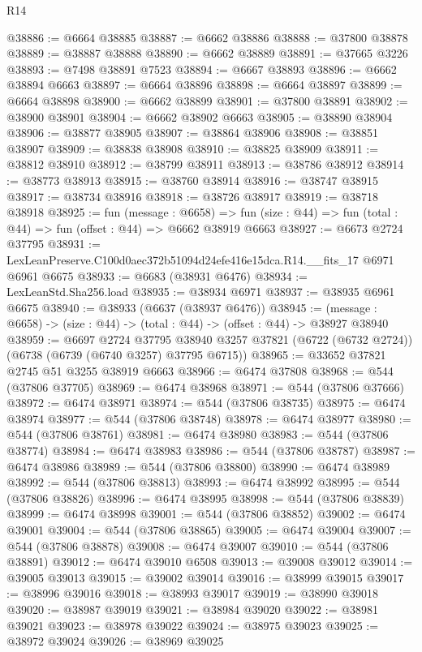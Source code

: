 \begin{lexlean}{R14}
\begin{coremodule}
@38886 := @6664 @38885
@38887 := @6662 @38886
@38888 := @37800 @38878
@38889 := @38887 @38888
@38890 := @6662 @38889
@38891 := @37665 @3226
@38893 := @7498 @38891 @7523
@38894 := @6667 @38893
@38896 := @6662 @38894 @6663
@38897 := @6664 @38896
@38898 := @6664 @38897
@38899 := @6664 @38898
@38900 := @6662 @38899
@38901 := @37800 @38891
@38902 := @38900 @38901
@38904 := @6662 @38902 @6663
@38905 := @38890 @38904
@38906 := @38877 @38905
@38907 := @38864 @38906
@38908 := @38851 @38907
@38909 := @38838 @38908
@38910 := @38825 @38909
@38911 := @38812 @38910
@38912 := @38799 @38911
@38913 := @38786 @38912
@38914 := @38773 @38913
@38915 := @38760 @38914
@38916 := @38747 @38915
@38917 := @38734 @38916
@38918 := @38726 @38917
@38919 := @38718 @38918
@38925 := fun (message : @6658) =>
  fun (size : @44) => fun (total : @44) => fun (offset : @44) => @6662 @38919 @6663
@38927 := @6673 @2724 @37795
@38931 := LexLeanPreserve.C100d0aec372b51094d24efe416e15dca.R14.__fits_17 @6971 @6961 @6675
@38933 := @6683 (@38931 @6476)
@38934 := LexLeanStd.Sha256.load
@38935 := @38934 @6971
@38937 := @38935 @6961 @6675
@38940 := @38933 (@6637 (@38937 @6476))
@38945 := (message : @6658) -> (size : @44) -> (total : @44) -> (offset : @44) -> @38927 @38940
@38959 := @6697
    @2724
    @37795
    @38940
    @3257
    @37821
    (@6722 (@6732 @2724))
    (@6738 (@6739 (@6740 @3257) @37795 @6715))
@38965 := @33652 @37821 @2745 @51 @3255 @38919 @6663
@38966 := @6474 @37808
@38968 := @544 (@37806 @37705)
@38969 := @6474 @38968
@38971 := @544 (@37806 @37666)
@38972 := @6474 @38971
@38974 := @544 (@37806 @38735)
@38975 := @6474 @38974
@38977 := @544 (@37806 @38748)
@38978 := @6474 @38977
@38980 := @544 (@37806 @38761)
@38981 := @6474 @38980
@38983 := @544 (@37806 @38774)
@38984 := @6474 @38983
@38986 := @544 (@37806 @38787)
@38987 := @6474 @38986
@38989 := @544 (@37806 @38800)
@38990 := @6474 @38989
@38992 := @544 (@37806 @38813)
@38993 := @6474 @38992
@38995 := @544 (@37806 @38826)
@38996 := @6474 @38995
@38998 := @544 (@37806 @38839)
@38999 := @6474 @38998
@39001 := @544 (@37806 @38852)
@39002 := @6474 @39001
@39004 := @544 (@37806 @38865)
@39005 := @6474 @39004
@39007 := @544 (@37806 @38878)
@39008 := @6474 @39007
@39010 := @544 (@37806 @38891)
@39012 := @6474 @39010 @6508
@39013 := @39008 @39012
@39014 := @39005 @39013
@39015 := @39002 @39014
@39016 := @38999 @39015
@39017 := @38996 @39016
@39018 := @38993 @39017
@39019 := @38990 @39018
@39020 := @38987 @39019
@39021 := @38984 @39020
@39022 := @38981 @39021
@39023 := @38978 @39022
@39024 := @38975 @39023
@39025 := @38972 @39024
@39026 := @38969 @39025

\end{coremodule}
\end{lexlean}
